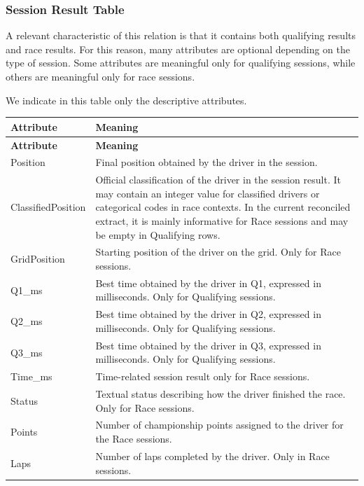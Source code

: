 \documentclass[a4paper,11pt]{article}
\begin{document}
	
	\subsubsection{Session Result Table}
	
	A relevant characteristic of this relation is that it contains both qualifying results and
	race results. For this reason, many attributes are optional depending on the type of
	session. Some attributes are meaningful only for qualifying sessions, while others are
	meaningful only for race sessions.
	
	We indicate in this table only the descriptive attributes.
	
	\begin{longtable}{|p{4cm}|p{10.8cm}|}
		\hline
		\textbf{Attribute} & \textbf{Meaning} \\
		\hline
		\endfirsthead
		
		\hline
		\textbf{Attribute} & \textbf{Meaning} \\
		\hline
		\endhead
		
		Position & Final position obtained by the driver in the session. \\ \hline
		
		ClassifiedPosition & Official classification of the driver in the session result. It may contain an integer value for classified drivers or categorical codes in race contexts. In the current reconciled extract, it is mainly informative for Race sessions and may be empty in Qualifying rows. \\ \hline
		
		GridPosition & Starting position of the driver on the grid. Only for Race sessions. \\ \hline
		
		Q1\_ms & Best time obtained by the driver in Q1, expressed in milliseconds. Only for Qualifying sessions. \\ \hline
		
		Q2\_ms & Best time obtained by the driver in Q2, expressed in milliseconds. Only for Qualifying sessions. \\ \hline
		
		Q3\_ms & Best time obtained by the driver in Q3, expressed in milliseconds. Only for Qualifying sessions. \\ \hline
		
		Time\_ms & Time-related session result only for Race sessions. \\ \hline
		
		Status & Textual status describing how the driver finished the race. Only for Race sessions. \\ \hline
		
		Points & Number of championship points assigned to the driver for the Race sessions. \\ \hline
		
		Laps & Number of laps completed by the driver. Only in Race sessions. \\ \hline
	\end{longtable}
	
\end{document}
